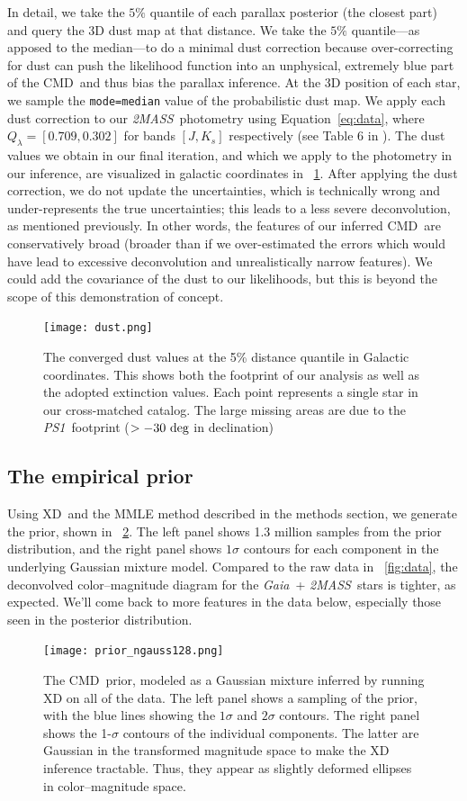 \documentclass[modern]{aastex61}
\newcommand{\acronym}[1]{{\small{#1}}}
\newcommand{\project}[1]{\textsl{#1}}
\newcommand{\tmass}{\project{\acronym{2MASS}}}
\newcommand{\psone}{\project{\acronym{PS1}}}
\newcommand{\gaia}{\project{Gaia}}
\newcommand{\xd}{\acronym{XD}}
\newcommand{\cmd}{\acronym{CMD}}
\begin{document}
In detail, we take the $5\%$
quantile of each parallax posterior (the closest part) and query the 3D dust map at that distance.
We take the $5\%$ quantile---as apposed to the median---to do a minimal dust
correction because over-correcting for dust can push the likelihood
function into an unphysical, extremely blue part of the \cmd\ and thus bias the
parallax inference. At the 3D position of each star, we sample the \texttt{mode=median} value of the probabilistic dust map.
We apply each dust correction to our
\tmass\ photometry using Equation~\ref{eq:data}, where $Q_{\lambda}
= [0.709, 0.302]$ for bands $[J, K_s]$ respectively (see Table 6 in
\citealt{schlafly11}).
The dust values we obtain in our final
iteration, and which we apply to the photometry in our inference, are visualized in
galactic coordinates in \figurename~\ref{fig:dust}.
After applying the dust correction, we do not update the uncertainties, which is
technically wrong and under-represents the true uncertainties; this leads to a less severe deconvolution, as mentioned previously.
In other words, the features of our inferred
  \cmd\ are conservatively broad (broader than if we over-estimated
  the errors which would have lead to excessive deconvolution and
  unrealistically narrow features). We could add the covariance of
the dust to our likelihoods, but this is beyond the scope of this
demonstration of concept.
\begin{figure}
\centering
  \texttt{[image: dust.png]}
\caption{The converged dust values at the 5\% distance quantile in Galactic coordinates. This shows both the footprint of our analysis as well as the adopted extinction values. Each point represents a single star in our cross-matched catalog. The large missing areas are due to the \psone\ footprint ($>-30~{\rm deg}$ in declination)}
\label{fig:dust}
\end{figure}

\subsection{The empirical prior}
Using \xd\ and the MMLE method described in the methods section, we generate the
prior, shown in \figurename~\ref{fig:prior}.
The left panel shows 1.3 million samples from the prior distribution, and the
right panel shows $1\sigma$ contours for each component in the underlying
Gaussian mixture model.
Compared to the raw data in \figurename~\ref{fig:data}, the deconvolved
color--magnitude diagram for the \gaia\ + \tmass\ stars is tighter, as expected.
We'll come back to more features in the data below, especially those seen in the posterior distribution.
\begin{figure}
\centering
  \texttt{[image: prior\_ngauss128.png]}
\caption{The \cmd\ prior, modeled as a Gaussian mixture inferred by
  running XD on all of the data. The left panel shows a sampling of
  the prior, with the blue lines showing the $1\sigma$ and $2\sigma$
  contours. The right panel shows the 1-$\sigma$ contours of the
  individual components. The latter are Gaussian in the transformed
  magnitude space to make the XD inference tractable. Thus, they
  appear as slightly deformed ellipses in color--magnitude space.}
\label{fig:prior}
\end{figure}
\end{document}
